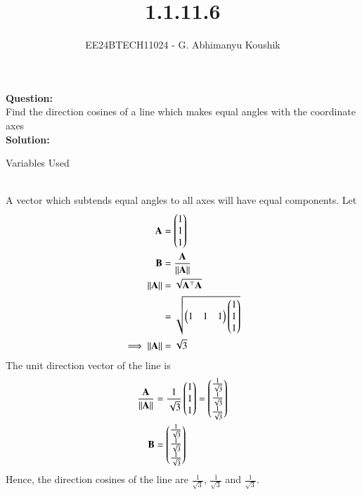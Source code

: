 \documentclass[journal]{IEEEtran}
\begin{document}

\vspace{3cm}

\title{1.1.11.6}
\author{EE24BTECH11024 - G. Abhimanyu Koushik
}
{\let\newpage\relax\maketitle}

\renewcommand{\thefigure}{\theenumi}
\renewcommand{\thetable}{\theenumi}
\setlength{\intextsep}{10pt} %

\textbf{Question:}\\
Find the direction cosines of a line which makes equal angles with the coordinate axes
\\
\textbf{Solution:}
\begin{table}[h!]    
  \centering
  
  \caption{Variables Used}
  \label{tab10.5.3.9.1}
\end{table}\\
A vector which subtends equal angles to all axes will have equal components. Let 
\begin{align}
	\mathbf{A} &= \begin{pmatrix}1\\1\\1\end{pmatrix}\\
	\mathbf{B} &= \frac{\mathbf{A}}{\left\lVert\mathbf{A}\right\rVert}\\
	\left\lVert\mathbf{A}\right\rVert &= \sqrt{\mathbf{A}^\top\mathbf{A}}\\
		     &= \sqrt{\begin{pmatrix}1 & 1 & 1\end{pmatrix}\begin{pmatrix}1\\1\\1\end{pmatrix}}\\
	\implies \left\lVert\mathbf{A}\right\rVert &= \sqrt{3}
\end{align}
The unit direction vector of the line is
\begin{align}
	\frac{\mathbf{A}}{\left\lVert\mathbf{A}\right\rVert} &= \frac{1}{\sqrt{3}}\begin{pmatrix}1\\1\\1\end{pmatrix} = \begin{pmatrix}\frac{1}{\sqrt{3}}\\\frac{1}{\sqrt{3}}\\\frac{1}{\sqrt{3}}\end{pmatrix}\\
	\mathbf{B} &= \begin{pmatrix}\frac{1}{\sqrt{3}}\\\frac{1}{\sqrt{3}}\\\frac{1}{\sqrt{3}}\end{pmatrix}
\end{align}
Hence, the direction cosines of the line are $\frac{1}{\sqrt{3}}$, $\frac{1}{\sqrt{3}}$ and $\frac{1}{\sqrt{3}}$.
\end{document}
